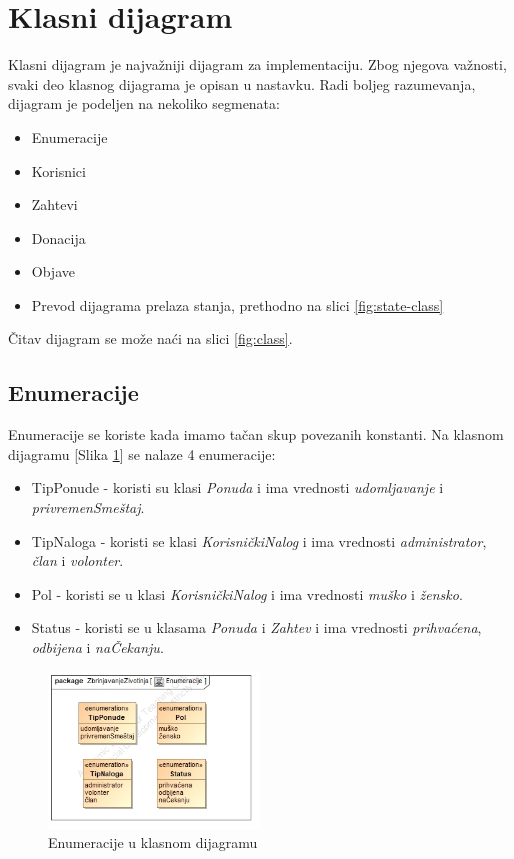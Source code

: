 \section{Klasni dijagram}
\par Klasni dijagram je najvažniji dijagram za implementaciju. Zbog njegova važnosti, svaki deo klasnog dijagrama je opisan u nastavku.
Radi boljeg razumevanja, dijagram je podeljen na nekoliko segmenata:
\begin{itemize}
    \item Enumeracije
    \item Korisnici
    \item Zahtevi
    \item Donacija
    \item Objave
    \item Prevod dijagrama prelaza stanja, prethodno na slici \ref{fig:state-class}
\end{itemize}
Čitav dijagram se može naći na slici \ref{fig:class}.
\subsection{Enumeracije}
\par Enumeracije se koriste kada imamo tačan skup povezanih konstanti. Na klasnom dijagramu [Slika \ref{fig:enums}] se nalaze 4 enumeracije: 
\begin{itemize}
    \item TipPonude - koristi su klasi \textit{Ponuda} i ima vrednosti \textit{udomljavanje} i \textit{privremenSmeštaj}.
    \item TipNaloga - koristi se klasi \textit{KorisničkiNalog} i ima vrednosti \textit{administrator}, \textit{član} i \textit{volonter}.
    \item Pol - koristi se u klasi \textit{KorisničkiNalog} i ima vrednosti \textit{muško} i \textit{žensko}.
    \item Status - koristi se u klasama \textit{Ponuda} i \textit{Zahtev} i ima vrednosti \textit{prihvaćena}, \textit{odbijena} i \textit{naČekanju}.
\end{itemize}
\begin{figure}[h]
    \centering
    \includegraphics[width=0.5\textwidth, height=0.4\textwidth]{img/enums.jpg}
    \caption{Enumeracije u klasnom dijagramu}
    \label{fig:enums}
\end{figure}
